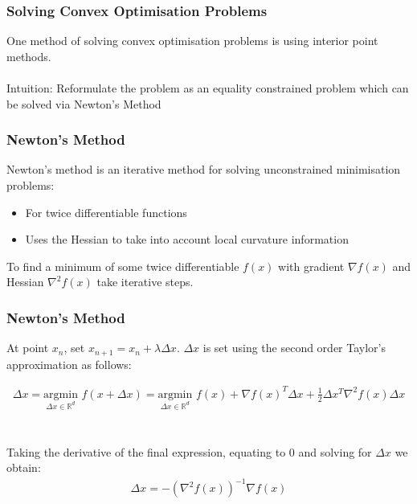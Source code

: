 \documentclass{beamer}
\def\rnum{\mathbb{R}}
\begin{document}
\begin{frame}
    \frametitle{Solving Convex Optimisation Problems}
    One method of solving convex optimisation problems is using interior point
    methods.
    \\~\\
    Intuition: Reformulate the problem as an equality constrained problem which
    can be solved via Newton's Method
\end{frame}

\begin{frame}
    \frametitle{Newton's Method}
    Newton's method is an iterative method for solving unconstrained minimisation problems:
    \begin{itemize}
        \item For twice differentiable functions
        \item Uses the Hessian to take into account local curvature information
    \end{itemize}
    To find a minimum of some twice differentiable $f(x)$ with gradient $\nabla
    f(x)$ and Hessian $\nabla^{2}f(x)$ take iterative
    steps.
\end{frame}

\begin{frame}
    \frametitle{Newton's Method}
    At point $x_{n}$, set $x_{n+1} = x_{n} + \lambda \Delta x$. $\Delta x$ is set
    using the second order Taylor's approximation as follows:

    \begin{align*}
        \Delta x = \underset{\Delta x \in \rnum^{d}}{\text{argmin}}\, \,f(x + \Delta
        x) = \underset{\Delta x \in \rnum^{d}}{\text{argmin}} \, \, f(x) + \nabla f(x)^{T}
        \Delta x + \frac{1}{2}\Delta x^{T}\nabla^{2}f(x)\Delta x
    \end{align*}
    \\~\\
    Taking the derivative of the final expression, equating to 0 and solving for
    $\Delta x$ we obtain:
    \begin{align*}
        \Delta x = -(\nabla^{2}f(x))^{-1}\nabla f(x)
    \end{align*}
\end{frame}
\end{document}
